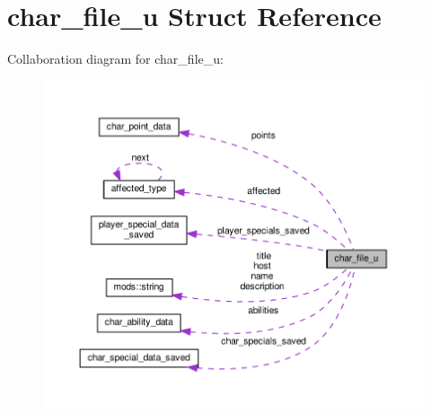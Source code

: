\hypertarget{structchar__file__u}{}\section{char\+\_\+file\+\_\+u Struct Reference}
\label{structchar__file__u}


Collaboration diagram for char\+\_\+file\+\_\+u\+:\nopagebreak
\begin{figure}[H]
\begin{center}
\leavevmode
\includegraphics[width=350pt]{structchar__file__u__coll__graph}
\end{center}
\end{figure}
